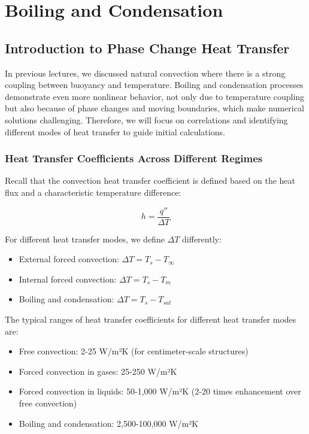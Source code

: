\section*{Boiling and Condensation}
\subsection*{Introduction to Phase Change Heat Transfer}
In previous lectures, we discussed natural convection where there is a strong coupling between buoyancy and temperature. Boiling and condensation processes demonstrate even more nonlinear behavior, not only due to temperature coupling but also because of phase changes and moving boundaries, which make numerical solutions challenging. Therefore, we will focus on correlations and identifying different modes of heat transfer to guide initial calculations.
\subsubsection*{Heat Transfer Coefficients Across Different Regimes}
Recall that the convection heat transfer coefficient is defined based on the heat flux and a characteristic temperature difference:

\[
h = \frac{q''}{\Delta T}
\]

For different heat transfer modes, we define $\Delta T$ differently:
\begin{itemize}
    \item External forced convection: $\Delta T = T_s - T_{\infty}$
    \item Internal forced convection: $\Delta T = T_s - T_m$
    \item Boiling and condensation: $\Delta T = T_s - T_{sat}$
\end{itemize}

The typical ranges of heat transfer coefficients for different heat transfer modes are:
\begin{itemize}
    \item Free convection: 2-25 W/m²K (for centimeter-scale structures)
    \item Forced convection in gases: 25-250 W/m²K
    \item Forced convection in liquids: 50-1,000 W/m²K (2-20 times enhancement over free convection)
    \item Boiling and condensation: 2,500-100,000 W/m²K
\end{itemize}

